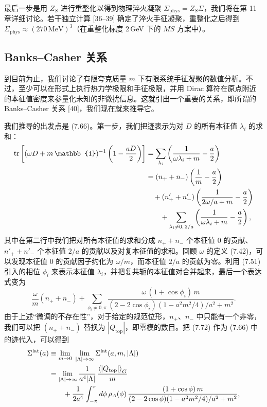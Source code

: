 最后一步是用 $Z_S$ 进行重整化以得到物理淬火凝聚 $\Sigma_{\mathrm{phys}} = Z_S \Sigma$，我们将在第 11 章详细讨论。若干独立计算 [36--39] 确定了淬火手征凝聚，重整化之后得到 $\Sigma_{\mathrm{phys}} \approx (270\,\mathrm{MeV})^3$（在重整化标度 2\,GeV 下的 $\overline{MS}$ 方案中）。

\subsection{Banks--Casher 关系}

到目前为止，我们讨论了有限夸克质量 $m$ 下有限系统手征凝聚的数值分析。不过，至少可以在形式上执行热力学极限和手征极限，并用 Dirac 算符在原点附近的本征值密度来参量化未知的非微扰信息。这就引出一个重要的关系，即所谓的 Banks--Casher 关系 [40]，我们现在就来推导它。

我们推导的出发点是 (7.66)。第一步，我们把迹表示为对 $D$ 的所有本征值 $\lambda_i$ 的求和：
\begin{align}
  \tr\left[(\omega D + m\,\mathbb{1})^{-1}\left(1-\frac{aD}{2}\right)\right]
  &= \sum_{\lambda_i}\left(\frac{1}{\omega\lambda_i + m} - \frac{a}{2}\right) \notag\\
  &= (n_+ + n_-)\left(\frac{1}{m} - \frac{a}{2}\right) \notag\\
  &\quad + (n'_+ + n'_-)\left(\frac{1}{2\omega/a + m} - \frac{a}{2}\right) \notag\\
  &\qquad + \sum_{\lambda_i \neq 0,\,2/a}\left(\frac{1}{\omega\lambda_i + m} - \frac{a}{2}\right),
\end{align}
其中在第二行中我们把对所有本征值的求和分成 $n_+ + n_-$ 个本征值 $0$ 的贡献、$n'_+ + n'_-$ 个本征值 $2/a$ 的贡献以及对复本征值的求和。回顾 $\omega$ 的定义 (7.42)，可以发现本征值 $0$ 的贡献因子约化为 $\omega/m$，而本征值 $2/a$ 的贡献为零。利用 (7.51) 引入的相位 $\phi_i$ 来表示本征值 $\lambda_i$，并把复共轭的本征值对合并起来，最后一个表达式变为
\begin{equation}
  \frac{\omega}{m}(n_+ + n_-) + \sum_{\phi_i \neq 0,\pi}
  \frac{\omega\,(1+\cos\phi_i)\,m}{(2-2\cos\phi_i)(1-a^2m^2/4)/a^2 + m^2} .
\end{equation}
由于上述``微调的不存在性''，对于给定的规范位形，$n_+$、$n_-$ 中只能有一个非零，我们可以把 $(n_+ + n_-)$ 替换为 $|Q_{\mathrm{top}}|$，即零模的数目。把 (7.72) 作为 (7.66) 中的迹代入，可以得到
\begin{align}
  \Sigma^{\mathrm{lat}}(a) &\equiv \lim_{m\to 0}\;\lim_{|\Lambda|\to\infty}
  \Sigma^{\mathrm{lat}}(a,m,|\Lambda|) \notag\\
  &= \lim_{|\Lambda|\to\infty}\frac{1}{a^4|\Lambda|}\,\frac{\left\langle |Q_{\mathrm{top}}| \right\rangle_G}{m}
   \notag\\
  &\qquad + \frac{1}{2a^4}\int_{-\pi}^{\pi}d\phi\,\rho_A(\phi)\,
     \frac{(1+\cos\phi)\,m}{(2-2\cos\phi)(1-a^2m^2/4)/a^2 + m^2},
\end{align}
